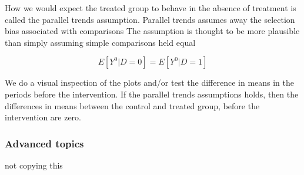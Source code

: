 How we would expect the treated group to behave in the absence of treatment is called the parallel trends assumption. Parallel trends assumes away the selection bias associated with comparisons
The assumption is thought to be more plausible than simply assuming simple comparisons held equal

\[
E[Y^0|D=0] = E[Y^0|D=1]
\]

We do a visual inspection of the plots and/or test the difference in means in the periods
before the intervention. If the parallel trends assumptions holds, then the differences in
means between the control and treated group, before the intervention are zero.
\subsubsection{Advanced topics}

not copying this










































